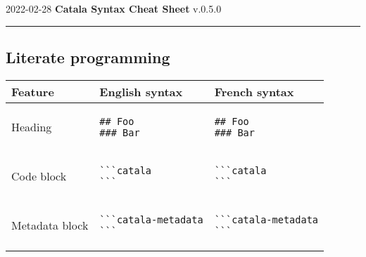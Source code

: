 \documentclass[a3paper,landscape]{article}
\begin{document}
\begin{center}
  2022-02-28
  \hfill
  {\Huge\bfseries\sffamily
    Catala Syntax Cheat Sheet}
  \hfill
  v.0.5.0
\end{center}
\hrule

\begin{multicols*}{2}

  \section*{Literate programming}
  \begin{center}
    \begin{tabular}{p{}p{}p{}}
      \toprule
      Feature        & English syntax & French syntax \\\midrule
      Heading        &
      \vspace*{-1.75em}
      \begin{verbatim}
## Foo
### Bar
\end{verbatim}
      \vspace*{-1.75em}
                     &
      \vspace*{-1.75em}
      \begin{verbatim}
## Foo
### Bar
\end{verbatim}
      \vspace*{-1.75em}
      \\
      Code block     &
      \vspace*{-1.75em}
      \begin{verbatim}
```catala
```
\end{verbatim}
      \vspace*{-1.75em}
                     &
      \vspace*{-1.75em}
      \begin{verbatim}
```catala
```
\end{verbatim}
      \vspace*{-1.75em}
      \\
      Metadata block &
      \vspace*{-1.75em}
      \begin{verbatim}
```catala-metadata
```
\end{verbatim}
      \vspace*{-1.75em}
                     &
      \vspace*{-1.75em}
      \begin{verbatim}
```catala-metadata
```
\end{verbatim}

\end{tabular}
\end{center}
\end{multicols*}
\end{document}
